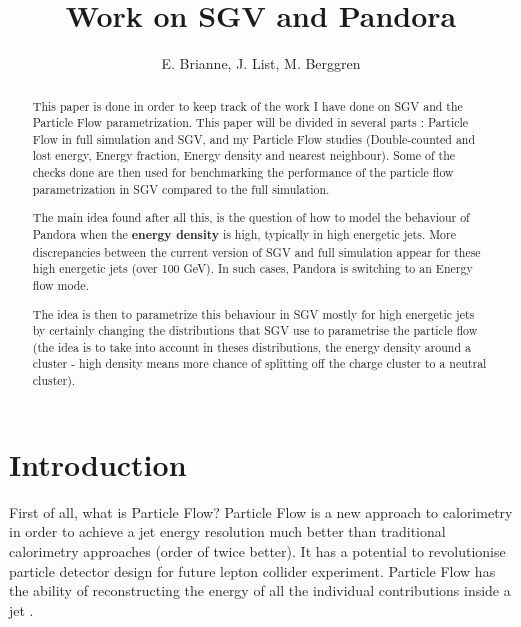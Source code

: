 \documentclass[a4paper,12pt]{article}
\title{Work on SGV and Pandora}
\author{E. Brianne, J. List, M. Berggren}
\date{}
\begin{document}
\maketitle

\begin{abstract}

This paper is done in order to keep track of the work I have done on SGV and the Particle Flow parametrization. This paper will be divided in several parts : Particle Flow in full simulation and SGV, and my Particle Flow studies (Double-counted and lost energy, Energy fraction, Energy density and nearest neighbour). Some of the checks done are then used for benchmarking the performance of the particle flow parametrization in SGV compared to the full simulation.

The main idea found after all this, is the question of how to model the behaviour of Pandora when the \textbf{energy density }is high, typically in high energetic jets. More discrepancies between the current version of SGV and full simulation appear for these high energetic jets (over 100 GeV). In such cases, Pandora is switching to an Energy flow mode. 

The idea is then to parametrize this behaviour in SGV mostly for high energetic jets by certainly changing the distributions that SGV use to parametrise the particle flow (the idea is to take into account in theses distributions, the energy density around a cluster - high density means more chance of splitting off the charge cluster to a neutral cluster).

\end{abstract}

\cleardoublepage
\tableofcontents
\cleardoublepage

\section{Introduction}

First of all, what is Particle Flow? Particle Flow is a new approach to calorimetry in order to achieve a jet energy resolution much better than traditional calorimetry approaches (order of twice better). It has a potential to revolutionise particle detector design for future lepton collider experiment. Particle Flow has the ability of reconstructing the energy of all the individual contributions inside a jet \cite{Thomson}.
\end{document}
